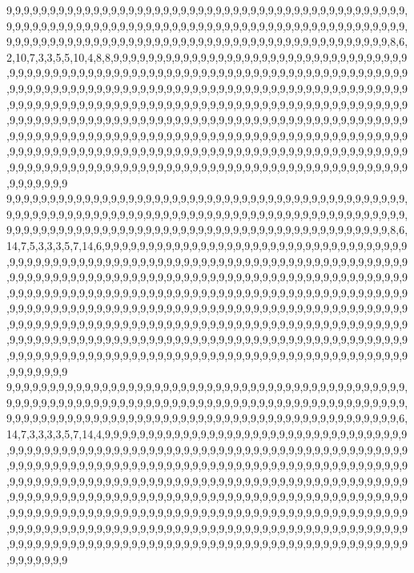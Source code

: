 9,9,9,9,9,9,9,9,9,9,9,9,9,9,9,9,9,9,9,9,9,9,9,9,9,9,9,9,9,9,9,9,9,9,9,9,9,9,9,9,9,9,9,9,9,9,9,9,9,9,9,9,9,9,9,9,9,9,9,9,9,9,9,9,9,9,9,9,9,9,9,9,9,9,9,9,9,9,9,9,9,9,9,9,9,9,9,9,9,9,9,9,9,9,9,9,9,9,9,9,9,9,9,9,9,9,9,9,9,9,9,9,9,9,9,9,9,9,9,9,9,9,9,9,9,9,9,9,9,9,9,9,9,9,9,9,8,6,2,10,7,3,3,5,5,10,4,8,8,9,9,9,9,9,9,9,9,9,9,9,9,9,9,9,9,9,9,9,9,9,9,9,9,9,9,9,9,9,9,9,9,9,9,9,9,9,9,9,9,9,9,9,9,9,9,9,9,9,9,9,9,9,9,9,9,9,9,9,9,9,9,9,9,9,9,9,9,9,9,9,9,9,9,9,9,9,9,9,9,9,9,9,9,9,9,9,9,9,9,9,9,9,9,9,9,9,9,9,9,9,9,9,9,9,9,9,9,9,9,9,9,9,9,9,9,9,9,9,9,9,9,9,9,9,9,9,9,9,9,9,9,9,9,9,9,9,9,9,9,9,9,9,9,9,9,9,9,9,9,9,9,9,9,9,9,9,9,9,9,9,9,9,9,9,9,9,9,9,9,9,9,9,9,9,9,9,9,9,9,9,9,9,9,9,9,9,9,9,9,9,9,9,9,9,9,9,9,9,9,9,9,9,9,9,9,9,9,9,9,9,9,9,9,9,9,9,9,9,9,9,9,9,9,9,9,9,9,9,9,9,9,9,9,9,9,9,9,9,9,9,9,9,9,9,9,9,9,9,9,9,9,9,9,9,9,9,9,9,9,9,9,9,9,9,9,9,9,9,9,9,9,9,9,9,9,9,9,9,9,9,9,9,9,9,9,9,9,9,9,9,9,9,9,9,9,9,9,9,9,9,9,9,9,9,9,9,9,9,9,9,9,9,9,9,9,9,9,9,9,9,9,9,9,9,9,9,9,9,9,9,9,9,9,9,9,9,9,9,9,9,9,9,9,9,9,9,9,9,9,9,9,9,9,9,9,9,9,9,9,9,9,9
9,9,9,9,9,9,9,9,9,9,9,9,9,9,9,9,9,9,9,9,9,9,9,9,9,9,9,9,9,9,9,9,9,9,9,9,9,9,9,9,9,9,9,9,9,9,9,9,9,9,9,9,9,9,9,9,9,9,9,9,9,9,9,9,9,9,9,9,9,9,9,9,9,9,9,9,9,9,9,9,9,9,9,9,9,9,9,9,9,9,9,9,9,9,9,9,9,9,9,9,9,9,9,9,9,9,9,9,9,9,9,9,9,9,9,9,9,9,9,9,9,9,9,9,9,9,9,9,9,9,9,9,9,9,9,9,8,6,14,7,5,3,3,3,5,7,14,6,9,9,9,9,9,9,9,9,9,9,9,9,9,9,9,9,9,9,9,9,9,9,9,9,9,9,9,9,9,9,9,9,9,9,9,9,9,9,9,9,9,9,9,9,9,9,9,9,9,9,9,9,9,9,9,9,9,9,9,9,9,9,9,9,9,9,9,9,9,9,9,9,9,9,9,9,9,9,9,9,9,9,9,9,9,9,9,9,9,9,9,9,9,9,9,9,9,9,9,9,9,9,9,9,9,9,9,9,9,9,9,9,9,9,9,9,9,9,9,9,9,9,9,9,9,9,9,9,9,9,9,9,9,9,9,9,9,9,9,9,9,9,9,9,9,9,9,9,9,9,9,9,9,9,9,9,9,9,9,9,9,9,9,9,9,9,9,9,9,9,9,9,9,9,9,9,9,9,9,9,9,9,9,9,9,9,9,9,9,9,9,9,9,9,9,9,9,9,9,9,9,9,9,9,9,9,9,9,9,9,9,9,9,9,9,9,9,9,9,9,9,9,9,9,9,9,9,9,9,9,9,9,9,9,9,9,9,9,9,9,9,9,9,9,9,9,9,9,9,9,9,9,9,9,9,9,9,9,9,9,9,9,9,9,9,9,9,9,9,9,9,9,9,9,9,9,9,9,9,9,9,9,9,9,9,9,9,9,9,9,9,9,9,9,9,9,9,9,9,9,9,9,9,9,9,9,9,9,9,9,9,9,9,9,9,9,9,9,9,9,9,9,9,9,9,9,9,9,9,9,9,9,9,9,9,9,9,9,9,9,9,9,9,9,9,9,9,9,9,9,9,9,9,9,9,9,9,9,9,9,9,9,9,9
9,9,9,9,9,9,9,9,9,9,9,9,9,9,9,9,9,9,9,9,9,9,9,9,9,9,9,9,9,9,9,9,9,9,9,9,9,9,9,9,9,9,9,9,9,9,9,9,9,9,9,9,9,9,9,9,9,9,9,9,9,9,9,9,9,9,9,9,9,9,9,9,9,9,9,9,9,9,9,9,9,9,9,9,9,9,9,9,9,9,9,9,9,9,9,9,9,9,9,9,9,9,9,9,9,9,9,9,9,9,9,9,9,9,9,9,9,9,9,9,9,9,9,9,9,9,9,9,9,9,9,9,9,9,9,9,9,6,14,7,3,3,3,3,5,7,14,4,9,9,9,9,9,9,9,9,9,9,9,9,9,9,9,9,9,9,9,9,9,9,9,9,9,9,9,9,9,9,9,9,9,9,9,9,9,9,9,9,9,9,9,9,9,9,9,9,9,9,9,9,9,9,9,9,9,9,9,9,9,9,9,9,9,9,9,9,9,9,9,9,9,9,9,9,9,9,9,9,9,9,9,9,9,9,9,9,9,9,9,9,9,9,9,9,9,9,9,9,9,9,9,9,9,9,9,9,9,9,9,9,9,9,9,9,9,9,9,9,9,9,9,9,9,9,9,9,9,9,9,9,9,9,9,9,9,9,9,9,9,9,9,9,9,9,9,9,9,9,9,9,9,9,9,9,9,9,9,9,9,9,9,9,9,9,9,9,9,9,9,9,9,9,9,9,9,9,9,9,9,9,9,9,9,9,9,9,9,9,9,9,9,9,9,9,9,9,9,9,9,9,9,9,9,9,9,9,9,9,9,9,9,9,9,9,9,9,9,9,9,9,9,9,9,9,9,9,9,9,9,9,9,9,9,9,9,9,9,9,9,9,9,9,9,9,9,9,9,9,9,9,9,9,9,9,9,9,9,9,9,9,9,9,9,9,9,9,9,9,9,9,9,9,9,9,9,9,9,9,9,9,9,9,9,9,9,9,9,9,9,9,9,9,9,9,9,9,9,9,9,9,9,9,9,9,9,9,9,9,9,9,9,9,9,9,9,9,9,9,9,9,9,9,9,9,9,9,9,9,9,9,9,9,9,9,9,9,9,9,9,9,9,9,9,9,9,9,9,9,9,9,9,9,9,9,9,9,9,9,9,9,9,9
